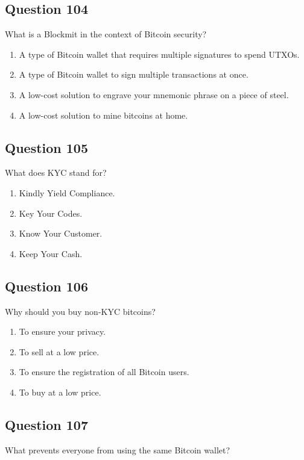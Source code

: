 \documentclass[12pt,a4paper]{article}
\begin{document}
\bigskip


\subsection*{Question 104}
What is a Blockmit in the context of Bitcoin security?

\begin{enumerate}[label=\Alph*., leftmargin=*]
\item A type of Bitcoin wallet that requires multiple signatures to spend UTXOs.
\item A type of Bitcoin wallet to sign multiple transactions at once.
\item A low-cost solution to engrave your mnemonic phrase on a piece of steel.
\item A low-cost solution to mine bitcoins at home.
\end{enumerate}

\bigskip


\subsection*{Question 105}
What does KYC stand for?

\begin{enumerate}[label=\Alph*., leftmargin=*]
\item Kindly Yield Compliance.
\item Key Your Codes.
\item Know Your Customer.
\item Keep Your Cash.
\end{enumerate}

\bigskip


\subsection*{Question 106}
Why should you buy non-KYC bitcoins?

\begin{enumerate}[label=\Alph*., leftmargin=*]
\item To ensure your privacy.
\item To sell at a low price.
\item To ensure the registration of all Bitcoin users.
\item To buy at a low price.
\end{enumerate}

\bigskip


\subsection*{Question 107}
What prevents everyone from using the same Bitcoin wallet?
\end{document}
